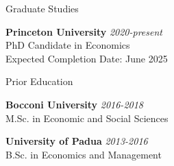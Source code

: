 \documentclass{resume} %
\begin{document}
\begin{rSection}{Graduate Studies}

{\bf Princeton University} \medskip \hfill {\em 2020-present} \\
PhD Candidate in Economics \smallskip \\
Expected Completion Date: June 2025 \medskip




\end{rSection}


\begin{rSection}{Prior Education}

{\bf Bocconi University} \medskip \hfill {\em 2016-2018} \\
M.Sc. in Economic and Social Sciences

{\bf University of Padua} \medskip \hfill {\em 2013-2016} \\
B.Sc. in Economics and Management

\end{rSection}
\end{document}
